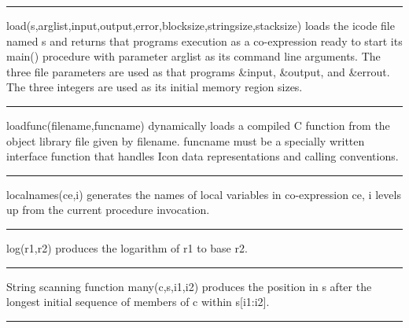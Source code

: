 \bigskip\hrule\vspace{0.1cm}

\noindent
{}\textsf{load(s,arglist,input,output,error,blocksize,stringsize,stacksize)}
loads the icode file named \textsf{s} and returns that
program{\textquotesingle}s execution as a co-expression ready to start
its \textsf{main()} procedure with parameter \textsf{arglist} as its
command line arguments. The three file parameters are used as that
program{\textquotesingle}s \textsf{\&input}, \textsf{\&output}, and
\textsf{\&errout}. The three integers are used as its initial memory
region sizes.

\bigskip\hrule\vspace{0.1cm}

\noindent
{}\textsf{loadfunc(filename,funcname)} dynamically
loads a compiled C function from the object library file given by
\textsf{filename}. \textsf{funcname} must be a specially written
interface function that handles Icon data representations and calling
conventions.

\bigskip\hrule\vspace{0.1cm}

\noindent
{}\textsf{localnames(ce,i)} generates the
names of local variables in co-expression \textsf{ce}, \textsf{i}
levels up from the current procedure invocation.

\bigskip\hrule\vspace{0.1cm}

\noindent
{}\textsf{log(r1,r2)} produces the logarithm of
\textsf{r1} to base \textsf{r2}.

\bigskip\hrule\vspace{0.1cm}

\noindent
{}String scanning function \textsf{many(c,s,i1,i2)} produces
the position in \textsf{s} after the longest initial sequence of
members of \textsf{c} within \textsf{s[i1:i2]}.

\bigskip\hrule\vspace{0.1cm}

